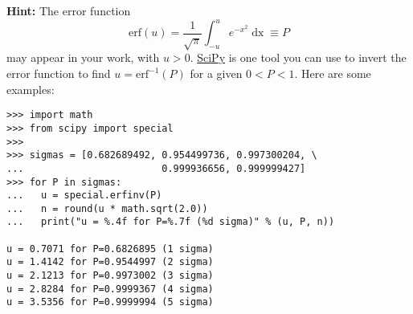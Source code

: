\documentclass[12 pt]{article} %
\renewcommand{\d}[1]{\ensuremath{\mathop{d#1}} }
\begin{document}
\vfill
\textbf{Hint:} The error function
\begin{equation*}
  \mathrm{erf}(u) = \frac{1}{\sqrt{\pi}} \int_{-u}^u e^{-x^2} \d{x} \equiv P
\end{equation*}
may appear in your work, with $u > 0$.
\href{https://scipy.org}{SciPy} is one tool you can use to invert the error function to find $u = \mathrm{erf}^{-1}(P)$ for a given $0 < P < 1$.
Here are some examples: \\[-30 pt]
\begin{verbatim}
>>> import math
>>> from scipy import special
>>>
>>> sigmas = [0.682689492, 0.954499736, 0.997300204, \
...                        0.999936656, 0.999999427]
>>> for P in sigmas:
...   u = special.erfinv(P)
...   n = round(u * math.sqrt(2.0))
...   print("u = %.4f for P=%.7f (%d sigma)" % (u, P, n))

u = 0.7071 for P=0.6826895 (1 sigma)
u = 1.4142 for P=0.9544997 (2 sigma)
u = 2.1213 for P=0.9973002 (3 sigma)
u = 2.8284 for P=0.9999367 (4 sigma)
u = 3.5356 for P=0.9999994 (5 sigma)
\end{verbatim}
\end{document}
